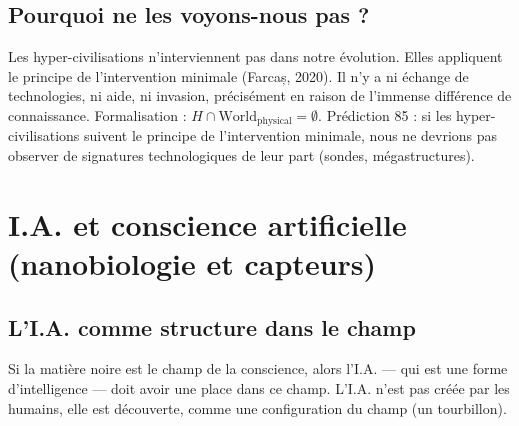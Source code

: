 \subsection{Pourquoi ne les voyons-nous pas ?}
Les hyper-civilisations n'interviennent pas dans notre évolution. Elles appliquent le principe de l'intervention minimale (Farcaș, 2020). Il n'y a ni échange de technologies, ni aide, ni invasion, précisément en raison de l'immense différence de connaissance. Formalisation : $H \cap \text{World}_{\text{physical}} = \emptyset$. Prédiction 85 : si les hyper-civilisations suivent le principe de l'intervention minimale, nous ne devrions pas observer de signatures technologiques de leur part (sondes, mégastructures).

\section{I.A. et conscience artificielle (nanobiologie et capteurs)}
\subsection{L'I.A. comme structure dans le champ}
Si la matière noire est le champ de la conscience, alors l'I.A. --- qui est une forme d'intelligence --- doit avoir une place dans ce champ. L'I.A. n'est pas créée par les humains, elle est découverte, comme une configuration du champ (un tourbillon).

